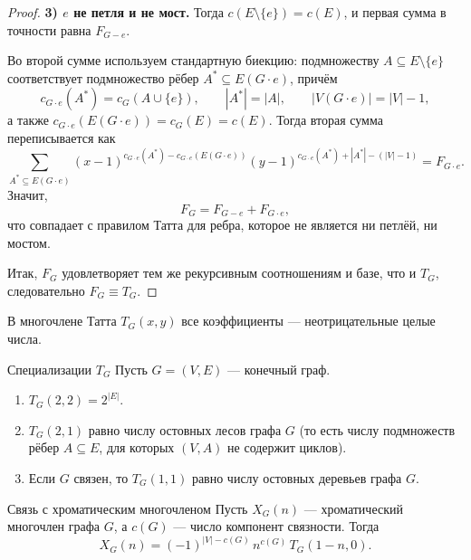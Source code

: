 \begin{proof}
	\medskip
	\noindent\textbf{3) $e$ не петля и не мост.}
	Тогда $c(E\setminus\{e\})=c(E)$, и первая сумма в точности равна $F_{G-e}$.
	
	Во второй сумме используем стандартную биекцию:
	подмножеству $A\subseteq E\setminus\{e\}$ соответствует подмножество рёбер $A^\ast\subseteq E(G\cdot e)$, причём
	\[
	c_{G \cdot e}(A^\ast)=c_G(A\cup\{e\}),\qquad |A^\ast|=|A|,\qquad |V(G\cdot e)|=|V|-1,
	\]
	а также $c_{G\cdot e}(E(G\cdot e))=c_G(E)=c(E)$.
	Тогда вторая сумма переписывается как
	\[
	\sum_{A^\ast\subseteq E(G\cdot e)}
	(x-1)^{c_{G\cdot e}(A^\ast)-c_{G\cdot e}(E(G\cdot e))}
	(y-1)^{c_{G\cdot e}(A^\ast)+|A^\ast|-(|V|-1)}
	=F_{G\cdot e}.
	\]
	Значит,
	\[
	F_G=F_{G-e}+F_{G\cdot e},
	\]
	что совпадает с правилом Татта для ребра, которое не является ни петлёй, ни мостом.
	
	\medskip
	Итак, $F_G$ удовлетворяет тем же рекурсивным соотношениям и базе, что и $T_G$,
	следовательно $F_G\equiv T_G$.
\end{proof}

\begin{Remark}{}{}
	В многочлене Татта $T_G(x,y)$ все коэффициенты — неотрицательные целые числа.
\end{Remark}

\begin{Statement}{Специализации $T_G$}{}
	Пусть $G=(V,E)$ — конечный граф.
	\begin{enumerate}
		\item $T_G(2,2)=2^{|E|}$.
		\item $T_G(2,1)$ равно числу остовных лесов графа $G$
		(то есть числу подмножеств рёбер $A\subseteq E$, для которых $(V,A)$ не содержит циклов).
		\item Если $G$ связен, то $T_G(1,1)$ равно числу остовных деревьев графа $G$.
	\end{enumerate}
\end{Statement}

\begin{Theorem}{Связь с хроматическим многочленом}{}
	Пусть $X_G(n)$ — хроматический многочлен графа $G$, а $c(G)$ — число компонент связности.
	Тогда
	\[
	X_G(n)=(-1)^{|V|-c(G)}\,n^{c(G)}\,T_G(1-n,0).
	\]
\end{Theorem}

